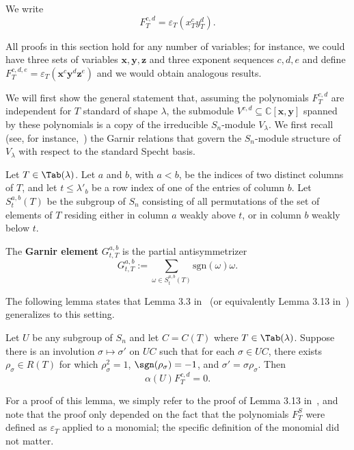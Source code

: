 \begin{definition}
	We write $$F_T^{c,d}=\varepsilon_T (x_T^cy_T^d).$$
\end{definition}


\begin{remark}
	All proofs in this section  hold for any number of variables; for instance, we could have three sets of variables $\mathbf{x},\mathbf{y},\mathbf{z}$ and three exponent sequences $c,d,e$ and define $F_T^{c,d,e}=\varepsilon_T (\mathbf{x}^c\mathbf{y}^d\mathbf{z}^e)$ and we would obtain analogous results.
\end{remark}

We will first show the general statement that, assuming the polynomials $F_T^{c,d}$ are independent for $T$ standard of shape $\lambda$, the submodule $V^{c,d}\subseteq \mathbb{C}[\mathbf{x},\mathbf{y}]$ spanned by these polynomials is a copy of the irreducible $S_n$-module $V_\lambda$.  We first recall (see, for instance,~\cite{Peel}) the Garnir relations that govern the $S_n$-module structure of $V_\lambda$ with respect to the standard Specht basis.


\begin{definition}
	Let $T\in \Tab(\lambda)$.  Let $a$ and $b$, with $a<b$, be the indices of two distinct columns of $T$, and let $t\le \lambda'_b$ be a row index of one of the entries of column $b$.  Let~$S^{a,b}_t(T)$ be the subgroup of $S_n$ consisting of all permutations of the set of elements of $T$ residing either in column $a$ weakly above $t$, or in column $b$ weakly below $t$. 
	
	The \textbf{Garnir element} $G^{a,b}_{t,T}$ is the partial antisymmetrizer $$G^{a,b}_{t,T}:=\sum_{\omega\in S^{a,b}_t(T)} \mathrm{sgn}(\omega)\omega.$$
\end{definition}

The following lemma states that Lemma 3.3 in~\cite{Peel} (or equivalently Lemma 3.13 in~\cite{GillespieRhoades}) generalizes to this setting.

\begin{lemma}\label{lem:alpha}
	Let $U$ be any subgroup of $S_n$ and let $C=C(T)$ where $T\in \Tab(\lambda)$.  Suppose there is an involution $\sigma\mapsto \sigma'$ on $UC$ such that for each $\sigma\in UC$, there exists $\rho_\sigma\in R(T)$ for which $\rho_\sigma^2=1$, $\sgn(\rho_\sigma)=-1$, and $\sigma'=\sigma\rho_\sigma$.  Then $$\alpha(U) F_T^{c,d}=0.$$
\end{lemma}

For a proof of this lemma, we simply refer to the proof of Lemma 3.13 in~\cite{GillespieRhoades}, and note that the proof only depended on the fact that the polynomials $F_T^S$ were defined as $\varepsilon_T$ applied to a monomial; the specific definition of the monomial did not matter.


